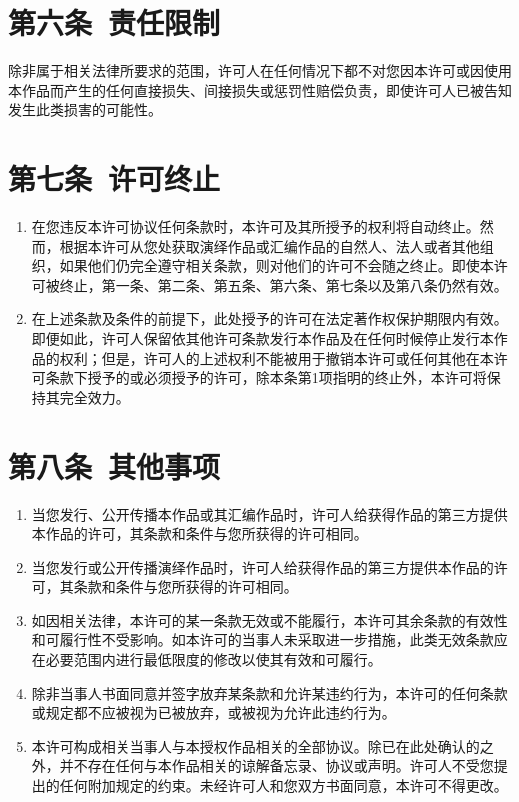 \section{第六条\ 责任限制}
除非属于相关法律所要求的范围，许可人在任何情况下都不对您因本许可或因使用本作品而产生的任何直接损失、间接损失或惩罚性赔偿负责，即使许可人已被告知发生此类损害的可能性。 
\section{第七条\ 许可终止}
\begin{enumerate}
	\item 在您违反本许可协议任何条款时，本许可及其所授予的权利将自动终止。然而，根据本许可从您处获取演绎作品或汇编作品的自然人、法人或者其他组织，如果他们仍完全遵守相关条款，则对他们的许可不会随之终止。即使本许可被终止，第一条、第二条、第五条、第六条、第七条以及第八条仍然有效。
	\item 在上述条款及条件的前提下，此处授予的许可在法定著作权保护期限内有效。即便如此，许可人保留依其他许可条款发行本作品及在任何时候停止发行本作品的权利；但是，许可人的上述权利不能被用于撤销本许可或任何其他在本许可条款下授予的或必须授予的许可，除本条第1项指明的终止外，本许可将保持其完全效力。
\end{enumerate}
\section{第八条\ 其他事项}
\begin{enumerate}
	\item 当您发行、公开传播本作品或其汇编作品时，许可人给获得作品的第三方提供本作品的许可，其条款和条件与您所获得的许可相同。
	\item 当您发行或公开传播演绎作品时，许可人给获得作品的第三方提供本作品的许可，其条款和条件与您所获得的许可相同。
	\item 如因相关法律，本许可的某一条款无效或不能履行，本许可其余条款的有效性和可履行性不受影响。如本许可的当事人未采取进一步措施，此类无效条款应在必要范围内进行最低限度的修改以使其有效和可履行。
	\item 除非当事人书面同意并签字放弃某条款和允许某违约行为，本许可的任何条款或规定都不应被视为已被放弃，或被视为允许此违约行为。
	\item 本许可构成相关当事人与本授权作品相关的全部协议。除已在此处确认的之外，并不存在任何与本作品相关的谅解备忘录、协议或声明。许可人不受您提出的任何附加规定的约束。未经许可人和您双方书面同意，本许可不得更改。
\end{enumerate}
